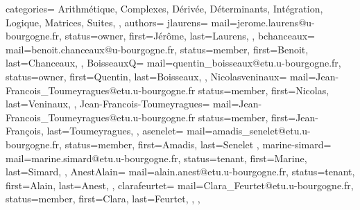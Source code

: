 {
  categories={
    Arithmétique,
    Complexes,
    Dérivée,
    Déterminants,
    Intégration,
    Logique,
    Matrices,
    Suites,
  },
  authors={
    jlaurens={
      mail=jerome.laurens@u-bourgogne.fr,
      status=owner,
      first=Jérôme,
      last=Laurens,
    },
    bchanceaux={
      mail=benoit.chanceaux@u-bourgogne.fr,
      status=member,
      first=Benoit,
      last=Chanceaux,
    },
    BoisseauxQ={
      mail=quentin_boisseaux@etu.u-bourgogne.fr,
      status=owner,
      first=Quentin,
      last=Boisseaux,
    },
    Nicolasveninaux={
      mail=Jean-Francois_Toumeyragues@etu.u-bourgogne.fr
      status=member,
      first=Nicolas,
      last=Veninaux,
    },
    Jean-Francois-Toumeyragues={
      mail=Jean-Francois_Toumeyragues@etu.u-bourgogne.fr
      status=member,
      first=Jean-François,
      last=Toumeyragues,
    },
    asenelet={
      mail=amadis_senelet@etu.u-bourgogne.fr, 
      status=member,
      first=Amadis,
      last=Senelet
    },
    marine-simard={
      mail=marine.simard@etu.u-bourgogne.fr,
      status=tenant,
      first=Marine,
      last=Simard,
    },  
    AnestAlain={
      mail=alain.anest@etu.u-bourgogne.fr,
      status=tenant,
      first=Alain,
      last=Anest,
    },
    clarafeurtet={
       mail=Clara_Feurtet@etu.u-bourgogne.fr,
       status=member,
       first=Clara,
       last=Feurtet,
     },
  },
}
